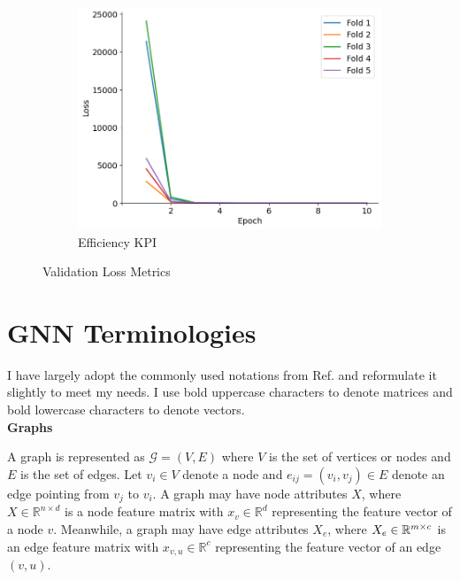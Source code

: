 \documentclass{report} %
\begin{document}
\begin{figure}[H]
\begin{subfigure}{0.32\textwidth}
        \centering
        \includegraphics[width=\textwidth]{./ReportImages/val_loss_y2.png}
        \caption{\centering Efficiency \ac{KPI}}
        \label{fig:Validation Loss for Efficiency grid}
    \end{subfigure}
    \caption{Validation Loss Metrics}
    \label{fig:Validation Loss Metrics}
\end{figure}

\section{GNN Terminologies}
\label{sec:GNN Terminologies}

I have largely adopt the commonly used notations from Ref. \cite{GNN-2019} and reformulate it slightly to meet my needs.
I use bold uppercase characters to denote matrices and bold lowercase characters to denote vectors.\\

\textbf{Graphs}

A graph is represented as \( \mathcal{G} = (V, E) \) where \( V \) is the set of vertices or nodes  and \( E \) is the set of edges. 
Let \( v_i \in V \) denote a node and \( e_{ij} = (v_i, v_j) \in E \) denote an edge pointing from \( v_j \) to \( v_i \).
A graph may have node attributes \( X \), where \( X \in \mathbb{R}^{n \times d} \) is a node feature matrix with 
\( x_v \in \mathbb{R}^d \) representing the feature vector of a node \( v \). 
Meanwhile, a graph may have edge attributes \( X_e \), where \( X_e \in \mathbb{R}^{m \times \\c} \) is an edge
feature matrix with \( x_{v,u} \in \mathbb{R}^c \) representing the feature vector of an edge \( (v, u) \).\\
\end{document}
